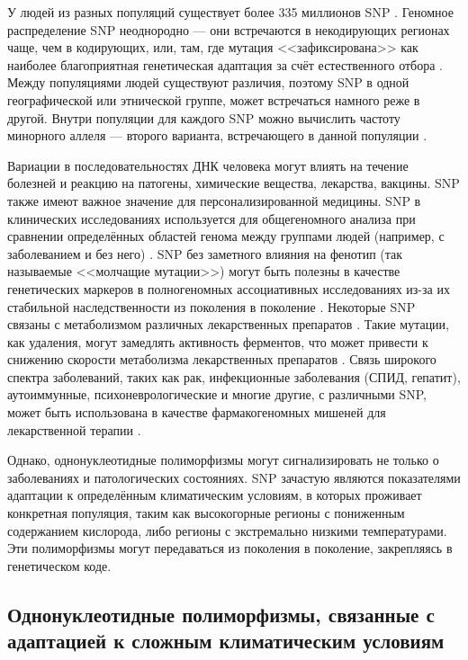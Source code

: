 У людей из разных популяций существует более 335 миллионов SNP \autocite{Auton2015}. Геномное распределение SNP неоднородно --- они встречаются в некодирующих регионах чаще, чем в кодирующих, или, там, где мутация <<зафиксирована>> как наиболее благоприятная генетическая адаптация за счёт естественного отбора \autocite{Barreiro2008}. Между популяциями людей существуют различия, поэтому SNP в одной географической или этнической группе, может встречаться намного реже в другой. Внутри популяции для каждого SNP можно вычислить частоту минорного аллеля --- второго варианта, встречающего в данной популяции \autocite{Zhu2015}. 

Вариации в последовательностях ДНК человека могут влиять на течение болезней и реакцию на патогены, химические вещества, лекарства, вакцины. SNP также имеют важное значение для персонализированной медицины. SNP в клинических исследованиях используется для общегеномного анализа при сравнении определённых областей генома между группами людей (например, с заболеванием и без него) \autocite{Yu2019}. SNP без заметного влияния на фенотип (так называемые <<молчащие мутации>>) могут быть полезны в качестве генетических маркеров в полногеномных ассоциативных исследованиях из-за их стабильной наследственности из поколения в поколение \autocite{Thomas2011}. Некоторые SNP связаны с метаболизмом различных лекарственных препаратов \autocite{Goldstein2001, Yanase2006}. Такие мутации, как удаления, могут замедлять активность ферментов, что может привести к снижению скорости метаболизма лекарственных препаратов \autocite{Butler2018}. Связь широкого спектра заболеваний, таких как рак, инфекционные заболевания (СПИД, гепатит), аутоиммунные, психоневрологические и многие другие, с различными SNP, может быть использована в качестве фармакогеномных мишеней для лекарственной терапии \autocite{Fareed2013}. 

Однако, однонуклеотидные полиморфизмы могут сигнализировать не только о заболеваниях и патологических состояниях. SNP зачастую являются показателями адаптации к определённым климатическим условиям, в которых проживает конкретная популяция, таким как высокогорные регионы с пониженным содержанием кислорода, либо регионы с экстремально низкими температурами. Эти полиморфизмы могут передаваться из поколения в поколение, закрепляясь в генетическом коде.

\subsection{Однонуклеотидные полиморфизмы, связанные с адаптацией к сложным климатическим условиям}\label{subsec:ch1/sec1/subsec6}

